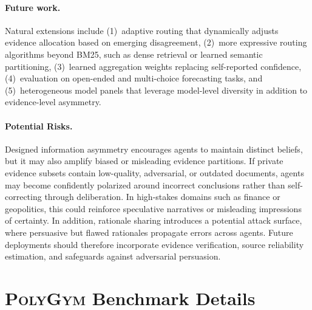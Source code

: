 \documentclass[11pt]{article}
\theoremstyle{plain}
\theoremstyle{definition}
\begin{document}

  \paragraph{Future work.}
Natural extensions include (1)~adaptive routing that dynamically adjusts evidence allocation based on emerging disagreement, (2)~more expressive routing algorithms beyond BM25, such as dense retrieval or learned semantic partitioning, (3)~learned aggregation weights replacing self-reported confidence, (4)~evaluation on open-ended and multi-choice forecasting tasks, and (5)~heterogeneous model panels that leverage model-level diversity in addition to evidence-level asymmetry.



\paragraph{Potential Risks.}
Designed information asymmetry encourages agents to maintain distinct beliefs, but it may also amplify biased or misleading evidence partitions. If private evidence subsets contain low-quality, adversarial, or outdated documents, agents may become confidently polarized around incorrect conclusions rather than self-correcting through deliberation. In high-stakes domains such as finance or geopolitics, this could reinforce speculative narratives or misleading impressions of certainty. In addition, rationale sharing introduces a potential attack surface, where persuasive but flawed rationales propagate errors across agents. Future deployments should therefore incorporate evidence verification, source reliability estimation, and safeguards against adversarial persuasion.

\section{\textbf{\textsc{PolyGym}} Benchmark Details}
\label{sec:appendix_dataset}
\end{document}
